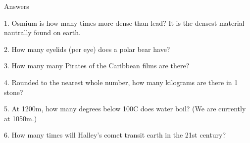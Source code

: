 \begin{frame}
\begin{center}
\Huge
Answers
\end{center}
\end{frame}
\begin{frame}
\begin{center}
\Large
1. Osmium is how many times more dense than lead? It is the densest material nautrally found on earth.
\\
\end{center}
\end{frame}
\begin{frame}
\begin{center}
\Large
2. How many eyelids (per eye) does a polar bear have?
\\
\end{center}
\end{frame}
\begin{frame}
\begin{center}
\Large
3. How many many Pirates of the Caribbean films are there?
\\
\end{center}
\end{frame}
\begin{frame}
\begin{center}
\Large
4. Rounded to the nearest whole number, how many kilograms are there in 1 stone?
\\
\end{center}
\end{frame}
\begin{frame}
\begin{center}
\Large
5. At 1200m, how many degrees below 100\textdegree C does water boil? (We are currently at 1050m.)
\\
\end{center}
\end{frame}
\begin{frame}
\begin{center}
\Large
6. How many times will Halley's comet transit earth in the 21st century?
\\
\end{center}
\end{frame}
